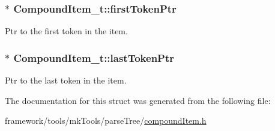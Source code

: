 \subsubsection[{\texorpdfstring{first\+Token\+Ptr}{firstTokenPtr}}]{$\ast$ Compound\+Item\+\_\+t\+::first\+Token\+Ptr}\hypertarget{struct_compound_item__t_a4d95dc788120f627e332491589d20c5c}{}\label{struct_compound_item__t_a4d95dc788120f627e332491589d20c5c}


Ptr to the first token in the item. 

\subsubsection[{\texorpdfstring{last\+Token\+Ptr}{lastTokenPtr}}]{$\ast$ Compound\+Item\+\_\+t\+::last\+Token\+Ptr}\hypertarget{struct_compound_item__t_ac4a3acd5ad3db3a3ed48a672999e9326}{}\label{struct_compound_item__t_ac4a3acd5ad3db3a3ed48a672999e9326}


Ptr to the last token in the item. 



The documentation for this struct was generated from the following file\+:\begin{DoxyCompactItemize}
\item 
framework/tools/mk\+Tools/parse\+Tree/\hyperlink{compound_item_8h}{compound\+Item.\+h}\end{DoxyCompactItemize}
